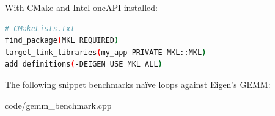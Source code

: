 With CMake and Intel oneAPI installed:
\begin{lstlisting}[language=bash,morekeywords={find_package,target_link_libraries}]
# CMakeLists.txt
find_package(MKL REQUIRED)
target_link_libraries(my_app PRIVATE MKL::MKL)
add_definitions(-DEIGEN_USE_MKL_ALL)
\end{lstlisting}

The following snippet benchmarks na\"ive loops against Eigen's GEMM:


                {code/gemm_benchmark.cpp}
